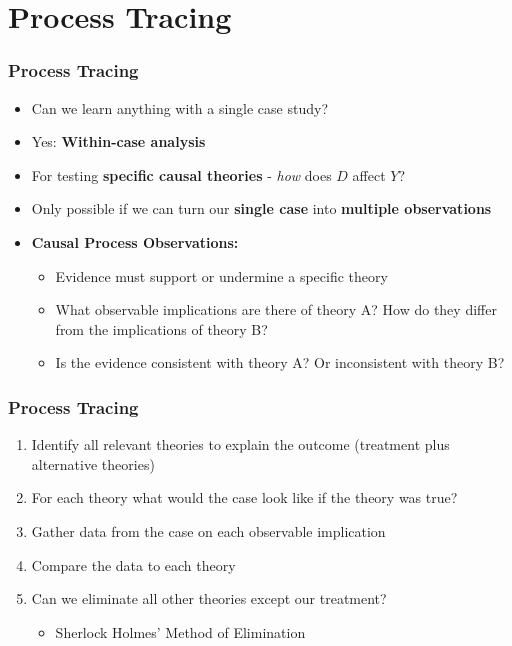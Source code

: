 \documentclass[xcolor=x11names,compress]{beamer}\usepackage[]{graphicx}\usepackage[]{color}
\renewcommand{\(}{\begin{columns}}
\renewcommand{\)}{\end{columns}}
\newcommand{\<}[1]{\begin{column}{#1}}
\renewcommand{\>}{\end{column}}
\begin{document}
\section{Process Tracing} 

\begin{frame}
\frametitle{Process Tracing}
\begin{itemize}
\item Can we learn anything with a single case study?
\pause
\item Yes: \textbf{Within-case analysis}
\pause
\item For testing \textbf{specific causal theories} - \textit{how} does $D$ affect $Y$?
\pause
\item Only possible if we can turn our \textbf{single case} into \textbf{multiple observations}
\pause
\item \textbf{Causal Process Observations:}
\begin{itemize}
\item Evidence must support or undermine a specific theory
\pause
\item What observable implications are there of theory A? How do they differ from the implications of theory B?
\pause
\item Is the evidence consistent with theory A? Or inconsistent with theory B?
\end{itemize}
\end{itemize}
\end{frame}

\begin{frame}
\frametitle{Process Tracing}
\begin{enumerate}
\item Identify all relevant theories to explain the outcome (treatment plus alternative theories)
\pause
\item For each theory what would the case look like if the theory was true?
\pause
\item Gather data from the case on each observable implication
\pause
\item Compare the data to each theory
\pause
\item Can we eliminate all other theories except our treatment?
\begin{itemize}
\item Sherlock Holmes' Method of Elimination
\end{itemize}
\end{enumerate}
\end{frame}
\end{document}
